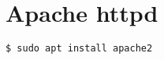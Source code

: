 \chapter{Apache httpd}


\begin{lstlisting}[language=bash]
$ sudo apt install apache2
\end{lstlisting}